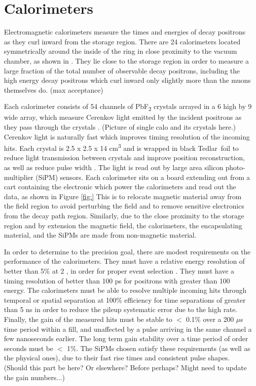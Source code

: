 \section{Calorimeters}
\label{sec:Calorimeters}


Electromagnetic calorimeters measure the times and energies of decay positrons as they curl inward from the storage region. There are 24 calorimeters located symmetrically around the inside of the ring in close proximity to the vacuum chamber, as shown in . They lie close to the storage region in order to measure a large fraction of the total number of observable decay positrons, including the high energy decay positrons which curl inward only slightly more than the muons themselves do. (max acceptance)

Each calorimeter consists of 54 channels of PbF\textsubscript{2} crystals arrayed in a 6 high by 9 wide array, which measure Cerenkov light emitted by the incident positrons as they pass through the crystals \cite{Fienberg:2014kka}. (Picture of single calo and its crystals here.) Cerenkov light is naturally fast which improves timing resolution of the incoming hits. Each crystal is 2.5 x 2.5 x 14 cm\textsuperscript{3} and is wrapped in black Tedlar\textregistered\ foil to reduce light transmission between crystals and improve position reconstruction, as well as reduce pulse width \cite{Kaspar:2016ofv}. The light is read out by large area silicon photo-multiplier (SiPM) sensors. Each calorimeter sits on a board extending out from a cart containing the electronic which power the calorimeters and read out the data, as shown in Figure \ref{fig:} This is to relocate magnetic material away from the field region to avoid perturbing the field and to remove sensitive electronics from the decay path region. Similarly, due to the close proximity to the storage region and by extension the magnetic field, the calorimeters, the encapsulating material, and the SiPMs are made from non-magnetic material.

In order to determine \amu to the precision goal, there are modest requirements on the performance of the calorimeters. They must have a relative energy resolution of better than 5\% at 2 \GeV, in order for proper event selection \cite{TDR}. They must have a timing resolution of better than 100 ps for positrons with greater than 100 \MeV energy. The calorimeters must be able to resolve multiple incoming hits through temporal or spatial separation at 100\% efficiency for time separations of greater than 5 ns in order to reduce the pileup systematic error due to the high rate. Finally, the gain of the measured hits must be stable to $<$ 0.1\% over a 200 $\mu$s time period within a fill, and unaffected by a pulse arriving in the same channel a few nanoseconds earlier. The long term gain stability over a time period of order seconds must be $<$ 1\%. The SiPMs chosen satisfy these requirements (as well as the physical ones), due to their fast rise times and consistent pulse shapes. (Should this part be here? Or elsewhere? Before perhaps? Might need to update the gain numbers...)

